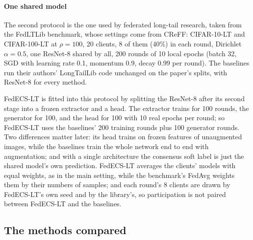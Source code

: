 \paragraph{One shared model} The second protocol is the one used by federated long-tail research, taken from the
FedLTLib benchmark, whose settings come from CReFF: CIFAR-10-LT and CIFAR-100-LT at $\rho=100$, 20 clients, 8 of them
(40\%) in each round, Dirichlet $\alpha=0.5$, one ResNet-8 shared by all, 200 rounds of 10 local epochs (batch 32, SGD
with learning rate 0.1, momentum 0.9, decay 0.99 per round). The baselines run their authors' LongTailLib code
unchanged on the paper's splits, with ResNet-8 for every method.

FedECS-LT is fitted into this protocol by splitting the ResNet-8 after its second stage into a frozen extractor and a
head. The extractor trains for 100 rounds, the generator for 100, and the head for 100 with 10 real epochs per round;
so FedECS-LT uses the baselines' 200 training rounds plus 100 generator rounds. Two differences matter later: its head
trains on frozen features of unaugmented images, while the baselines train the whole network end to end with
augmentation; and with a single architecture the consensus soft label is just the shared model's own prediction.
FedECS-LT averages the clients' models with equal weights, as in the main setting, while the benchmark's FedAvg weights
them by their numbers of samples; and each round's 8 clients are drawn by FedECS-LT's own seed and by the library's,
so participation is not paired between FedECS-LT and the baselines.

\subsection{The methods compared}\label{sec:s-methods}

